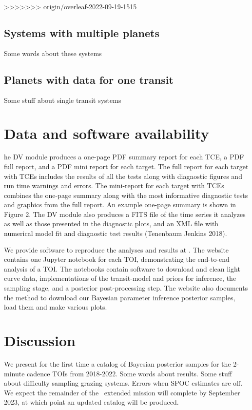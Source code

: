 \documentclass[floatfix,ApJL,twocolumn]{aastex631}
\begin{document}
>>>>>>> origin/overleaf-2022-09-19-1515


\subsection{Systems with multiple planets}
Some words about these systems

\subsection{Planets with data for one transit}
Some stuff about single transit systems


\section{Data and software availability}\label{sec:data}

he DV module produces a one-page PDF summary report for each TCE, a PDF full report, and a PDF mini report for each target. The full report for each target with TCEs includes the results of all the tests along with diagnostic figures and run time warnings and errors. The mini-report for each target with TCEs combines the one-page summary along with the most informative diagnostic tests and graphics from the full report. An example one-page summary is shown in Figure 2. The DV module also produces a FITS file of the time series it analyzes as well as those presented in the diagnostic plots, and an XML file with numerical model fit and diagnostic test results (Tenenbaum  Jenkins 2018).

We provide software to reproduce the analyses and results at \atlasUrl.
The website contains one Jupyter notebook for each TOI, demonstrating the end-to-end analysis of a TOI.
The notebooks contain software to download and clean light curve data, implementations of the transit-model and priors for inference, the \pymc sampling stage, and a posterior post-processing step.
The website also documents the method to download our Bayesian parameter inference posterior samples, load them and make various plots.

\section{Discussion}\label{sec:conclusion}
We present for the first time a catalog of Bayesian posterior samples for the 2-minute cadence TOIs from 2018-2022.
Some words about results.
Some stuff about difficulty sampling grazing systems.
Errors when SPOC estimates are off.
We expect the remainder of the \tess\ extended mission will complete by September 2023, at which point an updated catalog will be produced.
\end{document}
